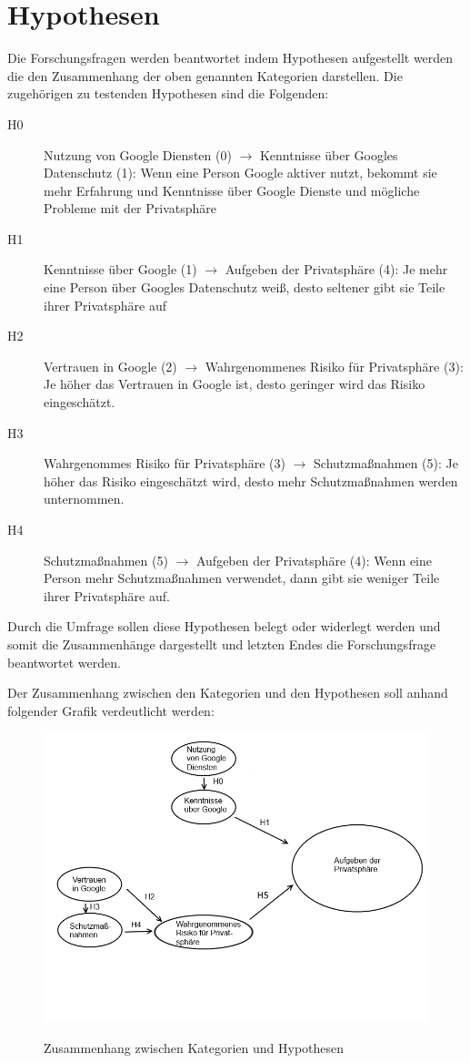 \section{Hypothesen}
Die Forschungsfragen werden beantwortet indem Hypothesen aufgestellt werden die den Zusammenhang der oben genannten Kategorien darstellen.
Die zugehörigen zu testenden Hypothesen sind die Folgenden:
\begin{description}
\item[H0] Nutzung von Google Diensten (0) $\rightarrow$ Kenntnisse über Googles Datenschutz (1): Wenn eine Person Google aktiver nutzt, bekommt sie mehr Erfahrung und Kenntnisse über Google Dienste und mögliche Probleme mit der Privatsphäre
\item[H1] Kenntnisse über Google (1) $\rightarrow$ Aufgeben der Privatsphäre (4): Je mehr eine Person über Googles Datenschutz weiß, desto seltener gibt sie Teile ihrer Privatsphäre auf
\item[H2] Vertrauen in Google (2) $\rightarrow$ Wahrgenommenes Risiko für Privatsphäre (3): Je höher das Vertrauen in Google ist, desto geringer wird das Risiko eingeschätzt.
\item[H3] Wahrgenommes Risiko für Privatsphäre (3) $\rightarrow$ Schutzmaßnahmen (5): Je höher das Risiko eingeschätzt wird, desto mehr Schutzmaßnahmen werden unternommen.
\item[H4] Schutzmaßnahmen (5) $\rightarrow$ Aufgeben der Privatsphäre (4): Wenn eine Person mehr Schutzmaßnahmen verwendet, dann gibt sie weniger Teile ihrer Privatsphäre auf.
\end{description}
Durch die Umfrage sollen diese Hypothesen belegt oder widerlegt werden und somit die Zusammenhänge dargestellt und letzten Endes die Forschungsfrage beantwortet werden.

Der Zusammenhang zwischen den Kategorien und den Hypothesen soll anhand folgender Grafik verdeutlicht werden:
\begin{figure}[H]
\centering
\includegraphics[scale=0.55]{images/bubbles}\\
\caption{Zusammenhang zwischen Kategorien und Hypothesen}\label{bubbles}
\end{figure}